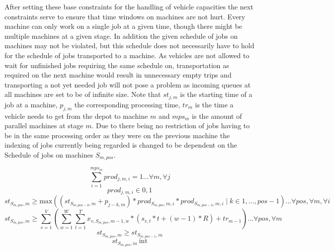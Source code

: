 After setting these base constraints for the handling of vehicle capacities the next constraints serve to ensure that time windows on machines are not hurt.
Every machine can only work on a single job at a given time, though there might be multiple machines at a given stage. In addition the given schedule of
jobs on machines may not be violated, but this schedule does not necessarily have to hold for the schedule of jobs transported to a machine. As vehicles
are not allowed to wait for unfinished jobs requiring the same schedule on, transportation as required on the next machine would result in unnecessary
empty trips and transporting a not yet needed job will not pose a problem as incoming queues at all machines are set to be of infinite size. Note that
\(st_{j,m}\) is the starting time of a job at a machine, \(p_{j,m}\) the corresponding processing time, \(tr_{m}\) is the time a vehicle needs to get from
the depot to machine \(m\) and \(mps_{m}\) is the amount of parallel machines at stage \(m\). Due to there being no restriction of jobs having to be in the
same processing order as they were on the previous machine the indexing of jobs currently being regarded is changed to be dependent on the Schedule of jobs
on machines \(S_{m,pos}\).

\begin{equation}
  \sum_{i = 1}^{mps_{m}}prod_{j,m,i} = 1 \ldots \forall m, \forall j
\end{equation}
\begin{equation}
  prod_{j,m,i} \in {0,1}
\end{equation}
\begin{equation}
 st_{S_{m,pos},m} \geq \mathrm{max}((st_{S_{m,pos-k}, m} + p_{j-k,m}) * prod_{S_{m,pos},m,i} * prod_{S_{m,pos-k},m,i}\mid k \in {1,\ldots,pos-1}) \ldots \forall pos, \forall m, \forall i
\end{equation}
\begin{equation}
 st_{S_{m,pos},m} \geq \sum_{v=1}^{V}(\sum_{w=1}^{W}\sum_{t=1}^{T} x_{v,S_{m,pos},m-1,w} * (s_{v,t} * t + (w-1) * R) + tr_{m-1}) \ldots \forall pos, \forall m
\end{equation}
\begin{equation}
  st_{S_{m,pos},m} \geq st_{S_{m,pos-1},m}
\end{equation}
\begin{equation}
  st_{S_{m,pos},m}\> \mathrm{int}
\end{equation}

